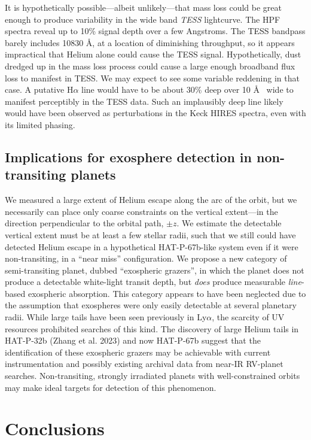 \documentclass[twocolumn]{aastex631}
\begin{document}
It is hypothetically possible---albeit unlikely---that mass loss could be great enough to produce variability in the wide band \emph{TESS} lightcurve.  The HPF spectra reveal up to 10\% signal depth over a few Angstroms.  The TESS bandpass barely includes 10830 \AA, at a location of diminishing throughput, so it appears impractical that Helium alone could cause the TESS signal.  Hypothetically, dust dredged up in the mass loss process could cause a large enough broadband flux loss to manifest in TESS.  We may expect to see some variable reddening in that case.  A putative H$\alpha$ line would have to be about 30\% deep over 10 \AA~ wide to manifest perceptibly in the TESS data.  Such an implausibly deep line likely would have been observed as perturbations in the Keck HIRES spectra, even with its limited phasing.

\subsection{Implications for exosphere detection in non-transiting planets}

We measured a large extent of Helium escape along the arc of the orbit, but we necessarily can place only coarse constraints on the vertical extent---in the direction perpendicular to the orbital path, $\pm z$.  We estimate the detectable vertical extent must be at least a few stellar radii, such that we still could have detected Helium escape in a hypothetical HAT-P-67b-like system even if it were non-transiting, in a ``near miss'' configuration.  We propose a new category of semi-transiting planet, dubbed ``exospheric grazers'', in which the planet does not produce a detectable white-light transit depth, but \emph{does} produce measurable \emph{line}-based exospheric absorption.  This category appears to have been neglected due to the assumption that exospheres were only easily detectable at several planetary radii.  While large tails have been seen previously in Ly$\alpha$, the scarcity of UV resources prohibited searches of this kind.  The discovery of large Helium tails in HAT-P-32b (Zhang et al. 2023) and now HAT-P-67b suggest that the identification of these exospheric grazers may be achievable with current instrumentation and possibly existing archival data from near-IR RV-planet searches.  Non-transiting, strongly irradiated planets with well-constrained orbits may make ideal targets for detection of this phenomenon.


\section{Conclusions}
\end{document}
